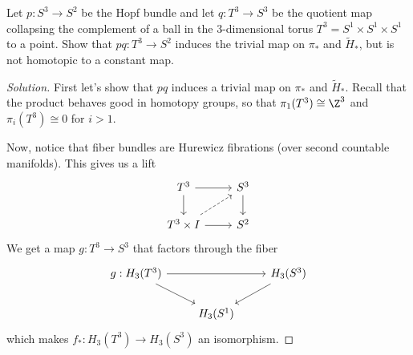 \begin{exercise}[4.2.34]
	Let $p:S^3\to S^2$ be the Hopf bundle and let $q:T^3\to S^3$ be the quotient map collapsing the complement of a ball in the 3-dimensional torus $T^3=S^1\times S^1\times S^1$ to a point. Show that $pq:T^3\to S^2$ induces the trivial map on {\color{magenta}$\pi_*$} and {\color{magenta}$\widetilde{H}_*$}, but is not homotopic to a constant map.
\end{exercise}
\begin{proof}[Solution]
	First let's show that $pq$ induces a trivial map on $\pi_*$ and $\widetilde{H}_*$. Recall that the product behaves good in homotopy groups, so that $\pi_{1}(T^3)\cong \Z^3$ and $\pi_{i}(T^3)\cong 0$ for $i>1$.

	Now, notice that fiber bundles are Hurewicz fibrations (over second countable manifolds). This gives us a lift
	\[\begin{tikzcd}
		T^3\arrow[r]\arrow[d]&S^3\arrow[d]\\
		T^3\times I\arrow[ur,dashed]\arrow[r]&S^2
	\end{tikzcd}\]
	We get a map $g:T^3\to S^3$ that factors through the fiber
\[\begin{tikzcd}
	g:H_3(T^3)\arrow[rr]\arrow[dr]&&H_3(S^3)\arrow[dl]\\
	&H_3(S^1)
\end{tikzcd}\]
which makes $f_*:H_3(T^3)\to H_3(S^3)$ an isomorphism.

\end{proof}


